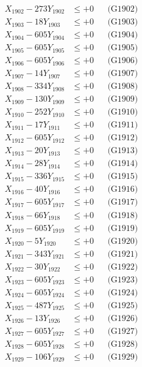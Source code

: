\documentclass[a4paper,10pt]{article}
\begin{document}
{\begin{align}
X_{1902} - 273Y_{1902} &\leq +0 && \text{(G1902)} \\
X_{1903} - 18Y_{1903} &\leq +0 && \text{(G1903)} \\
X_{1904} - 605Y_{1904} &\leq +0 && \text{(G1904)} \\
X_{1905} - 605Y_{1905} &\leq +0 && \text{(G1905)} \\
X_{1906} - 605Y_{1906} &\leq +0 && \text{(G1906)} \\
X_{1907} - 14Y_{1907} &\leq +0 && \text{(G1907)} \\
X_{1908} - 334Y_{1908} &\leq +0 && \text{(G1908)} \\
X_{1909} - 130Y_{1909} &\leq +0 && \text{(G1909)} \\
X_{1910} - 252Y_{1910} &\leq +0 && \text{(G1910)} \\
\allowbreak
X_{1911} - 17Y_{1911} &\leq +0 && \text{(G1911)} \\
X_{1912} - 605Y_{1912} &\leq +0 && \text{(G1912)} \\
X_{1913} - 20Y_{1913} &\leq +0 && \text{(G1913)} \\
X_{1914} - 28Y_{1914} &\leq +0 && \text{(G1914)} \\
X_{1915} - 336Y_{1915} &\leq +0 && \text{(G1915)} \\
X_{1916} - 40Y_{1916} &\leq +0 && \text{(G1916)} \\
X_{1917} - 605Y_{1917} &\leq +0 && \text{(G1917)} \\
X_{1918} - 66Y_{1918} &\leq +0 && \text{(G1918)} \\
X_{1919} - 605Y_{1919} &\leq +0 && \text{(G1919)} \\
X_{1920} - 5Y_{1920} &\leq +0 && \text{(G1920)} \\
\allowbreak
X_{1921} - 343Y_{1921} &\leq +0 && \text{(G1921)} \\
X_{1922} - 30Y_{1922} &\leq +0 && \text{(G1922)} \\
X_{1923} - 605Y_{1923} &\leq +0 && \text{(G1923)} \\
X_{1924} - 605Y_{1924} &\leq +0 && \text{(G1924)} \\
X_{1925} - 487Y_{1925} &\leq +0 && \text{(G1925)} \\
X_{1926} - 13Y_{1926} &\leq +0 && \text{(G1926)} \\
X_{1927} - 605Y_{1927} &\leq +0 && \text{(G1927)} \\
X_{1928} - 605Y_{1928} &\leq +0 && \text{(G1928)} \\
X_{1929} - 106Y_{1929} &\leq +0 && \text{(G1929)} \\

\end{align}}
\end{document}
